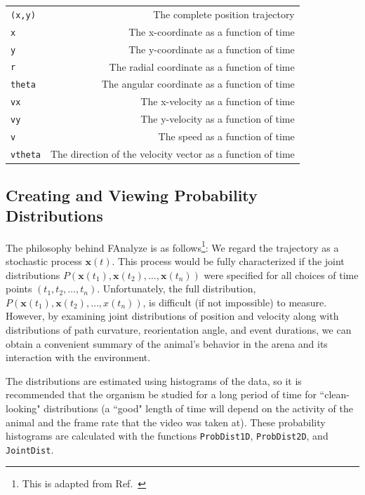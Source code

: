 \documentclass[letterpaper, 11pt]{article}
\begin{document}
\begin{tabular}{l r}
\texttt{(x,y)} & The complete position trajectory\\
\texttt{x} & The x-coordinate as a function of time\\
\texttt{y} & The y-coordinate as a function of time\\
\texttt{r} & The radial coordinate as a function of time \\
\texttt{theta} & The angular coordinate as a function of time\\
\texttt{vx} & The x-velocity as a function of time\\
\texttt{vy} & The y-velocity as a function of time\\
\texttt{v} & The speed as a function of time\\
\texttt{vtheta} & The direction of the velocity vector as a function of time
\end{tabular}

\subsection*{Creating and Viewing Probability Distributions}

The philosophy behind  FAnalyze is as follows\footnote{This is adapted from Ref.\ \cite{valente1}}:
We regard the trajectory as a stochastic process $\mathbf{x}(t)$.  This process would be fully
characterized if the joint distributions $P(\mathbf{x}(t_1), \mathbf{x}(t_2), \ldots
,\mathbf{x}(t_n))$ were specified for all choices of time points $(t_1,t_2, \ldots ,t_n )$.
Unfortunately, the full distribution, $P(\mathbf{x}(t_1), \mathbf{x}(t_2), \ldots ,x(t_n))$, is
difficult (if not impossible) to measure. However, by examining joint distributions of position and
velocity along with distributions of path curvature, reorientation angle, and event durations, we
can obtain a convenient summary of the animal's behavior in the arena and its interaction with the
environment.

The distributions are estimated using histograms of the data, so it is recommended that the
organism be studied for a long period of time for ``clean-looking" distributions (a ``good" length
of time will depend on the activity of the animal and the frame rate that the video was taken at).
These probability histograms are calculated with the functions \texttt{ProbDist1D},
\texttt{ProbDist2D}, and \texttt{JointDist}.
\end{document}
